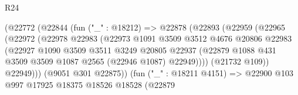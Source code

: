 \begin{lexlean}{R24}
\begin{coremodule}
                                    (@22772
                                      (@22844
                                        (fun ("_" : @18212) =>
                                        @22878
                                          (@22893
                                            (@22959
                                              (@22965
                                                (@22972
                                                  (@22978
                                                    @22983
                                                    (@22973
                                                      @1091
                                                      @3509
                                                      @3512
                                                      @4676
                                                      @20806
                                                      @22983
                                                      (@22927
                                                        @1090
                                                        @3509
                                                        @3511
                                                        @3249
                                                        @20805
                                                        @22937
                                                        (@22879
                                                          @1088
                                                          @431
                                                          @3509
                                                          @3509
                                                          @1087
                                                          @2565
                                                          (@22946 @1087)
                                                          @22949))))
                                                  (@21732 @109))
                                                @22949)))
                                          (@9051 @301 @22875))
                                        (fun ("_" : @18211 @4151) =>
                                        @22900
                                          @103
                                          @997
                                          @17925
                                          @18375
                                          @18526
                                          @18528
                                          (@22879

\end{coremodule}
\end{lexlean}
